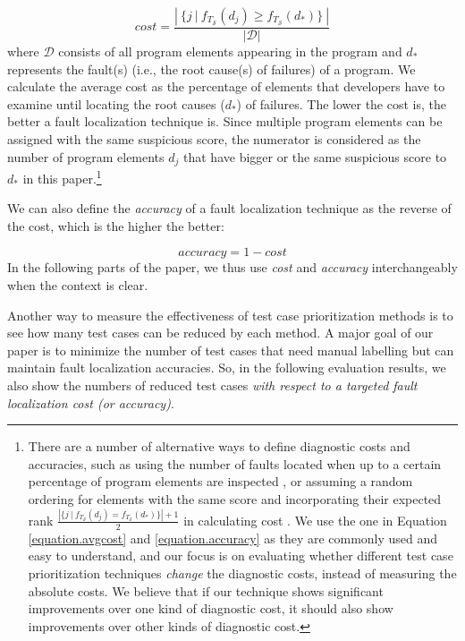 \begin{equation}\label{equation.avgcost}
	cost = \dfrac{\left|  \ \{ j \ | \ f_{T_{\mathcal{S}}}(d_j) \geq f_{T_{\mathcal{S}}}(d_*) \}  \ \right|}{\left|  \mathcal{D} \right|}
\end{equation}
where $\mathcal{D}$ consists of all program elements appearing in the program and $d_*$ represents the fault(s) (i.e., the root cause(s) of failures) of a program.
We calculate the average cost as the percentage of elements that developers have
to examine until locating the root causes ($d_*$) of failures. The lower the cost is, the better a fault localization technique is. 
Since multiple
program elements can be assigned with the same suspicious score, the numerator
is considered as the number of program elements $d_j$ that have bigger or the
same suspicious score to $d_*$ in this paper.\footnote{There are a number of alternative ways to define diagnostic costs and accuracies, such as using the number of faults located when up to a certain percentage of program elements are inspected \cite[e.g.][]{Wong2014,Debroy2013,CZ05,BaahPH10,JHS02,Lucia2014}, or assuming a random ordering for elements with the same score and incorporating their expected rank $\frac{\left| \{ j \ | \ f_{T_{\mathcal{S}}}(d_j) = f_{T_{\mathcal{S}}}(d_*) \} \right| + 1}{2}$ in calculating cost \cite[e.g.][]{Ali2009,Steimann2013,Steimann2012,Xu2011}. We use the one in Equation \ref{equation.avgcost} and \ref{equation.accuracy} as they are commonly used and easy to understand, and our focus is on evaluating whether different test case prioritization techniques {\em change} the diagnostic costs, instead of measuring the absolute costs. We believe that if our technique shows significant improvements over one kind of diagnostic cost, it should also show improvements over other kinds of diagnostic cost.}

We can also define the {\em accuracy} of a fault localization technique as the reverse of the cost, which is the higher the better:

\begin{equation}\label{equation.accuracy}
	accuracy = 1 - cost
\end{equation}
In the following parts of the paper, we thus use {\em cost} and {\em accuracy} interchangeably when the context is clear.

Another way to measure the effectiveness of test case prioritization methods is to see how many test cases can be reduced by each method.
A major goal of our paper is to minimize the number of test cases that need manual labelling but can maintain fault localization accuracies. So, in the following evaluation results, we also show the numbers of reduced test cases {\em with respect to a targeted fault localization cost (or accuracy)}.

